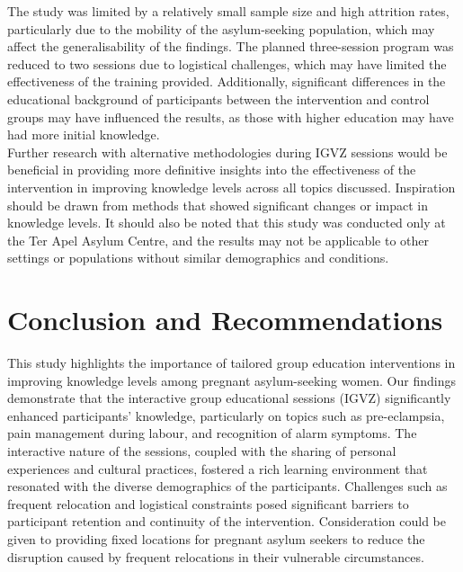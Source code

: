 \documentclass[12pt]{article}
\begin{document}
The study was limited by a relatively small sample size and high attrition rates, particularly due to the mobility of the asylum-seeking population, which may affect the generalisability of the findings. The planned three-session program was reduced to two sessions due to logistical challenges, which may have limited the effectiveness of the training provided. Additionally, significant differences in the educational background of participants between the intervention and control groups may have influenced the results, as those with higher education may have had more initial knowledge. \\

\noindent Further research with alternative methodologies during IGVZ sessions would be beneficial in providing more definitive insights into the effectiveness of the intervention in improving knowledge levels across all topics discussed. Inspiration should be drawn from methods that showed significant changes or impact in knowledge levels. It should also be noted that this study was conducted only at the Ter Apel Asylum Centre, and the results may not be applicable to other settings or populations without similar demographics and conditions.

\section{Conclusion and Recommendations}

\noindent This study highlights the importance of tailored group education interventions in improving knowledge levels among pregnant asylum-seeking women. Our findings demonstrate that the interactive group educational sessions (IGVZ) significantly enhanced participants' knowledge, particularly on topics such as pre-eclampsia, pain management during labour, and recognition of alarm symptoms. The interactive nature of the sessions, coupled with the sharing of personal experiences and cultural practices, fostered a rich learning environment that resonated with the diverse demographics of the participants. Challenges such as frequent relocation and logistical constraints posed significant barriers to participant retention and continuity of the intervention. Consideration could be given to providing fixed locations for pregnant asylum seekers to reduce the disruption caused by frequent relocations in their vulnerable circumstances. \\
\end{document}
